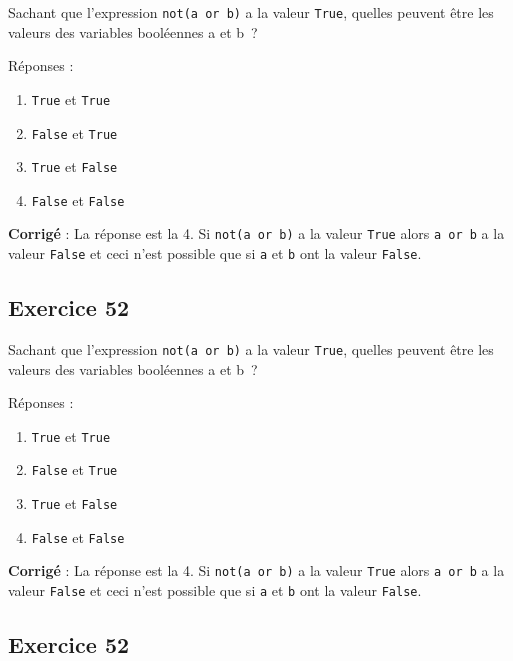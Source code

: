 \documentclass[11pt]{article}
\providecommand{\tightlist}{%
      \setlength{\itemsep}{0pt}\setlength{\parskip}{0pt}}
\begin{document}
Sachant que l'expression \texttt{not(a\ or\ b)} a la valeur
\texttt{True}, quelles peuvent être les valeurs des variables booléennes
a et b~?

Réponses :

\begin{enumerate}
\def\labelenumi{\arabic{enumi}.}
\tightlist
\item
  \texttt{True} et \texttt{True}
\item
  \texttt{False} et \texttt{True}
\item
  \texttt{True} et \texttt{False}
\item
  \texttt{False} et \texttt{False}
\end{enumerate}

    \textbf{Corrigé} : La réponse est la 4. Si \texttt{not(a\ or\ b)} a la
valeur \texttt{True} alors \texttt{a\ or\ b} a la valeur \texttt{False}
et ceci n'est possible que si \texttt{a} et \texttt{b} ont la valeur
\texttt{False}.

    \hypertarget{exercice-52}{%
\subsection{Exercice 52}\label{exercice-52}}

Sachant que l'expression \texttt{not(a\ or\ b)} a la valeur
\texttt{True}, quelles peuvent être les valeurs des variables booléennes
a et b~?

Réponses :

\begin{enumerate}
\def\labelenumi{\arabic{enumi}.}
\tightlist
\item
  \texttt{True} et \texttt{True}
\item
  \texttt{False} et \texttt{True}
\item
  \texttt{True} et \texttt{False}
\item
  \texttt{False} et \texttt{False}
\end{enumerate}

    \textbf{Corrigé} : La réponse est la 4. Si \texttt{not(a\ or\ b)} a la
valeur \texttt{True} alors \texttt{a\ or\ b} a la valeur \texttt{False}
et ceci n'est possible que si \texttt{a} et \texttt{b} ont la valeur
\texttt{False}.

    \hypertarget{exercice-52}{%
\subsection{Exercice 52}\label{exercice-52}}
\end{document}

